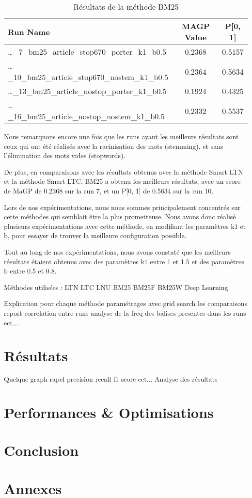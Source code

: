 \documentclass[a4paper, 12pt]{article}
\begin{document}
\begin{table}[h]
  \centering
  \begin{tabular}{l c c}
      \toprule
      \textbf{Run Name} & \textbf{MAGP Value} & \textbf{P[0, 1]} \\
      \midrule
      \dots\_7\_bm25\_article\_stop670\_porter\_k1\_b0.5 & 0.2368 & 0.5157 \\
      \dots\_10\_bm25\_article\_stop670\_nostem\_k1\_b0.5 & 0.2364 & 0.5634 \\
      \dots\_13\_bm25\_article\_nostop\_porter\_k1\_b0.5 & 0.1924 & 0.4325 \\
      \dots\_16\_bm25\_article\_nostop\_nostem\_k1\_b0.5 & 0.2332 & 0.5537 \\
      \bottomrule
  \end{tabular}
  \caption{Résultats de la méthode BM25}
  \label{tab:result_bm25}
\end{table}

Nous remarquons encore une fois que les runs ayant les meilleurs résultats sont ceux qui ont été réalisés 
avec la racinisation des mots (stemming), et sans l'élimination des mots vides (stopwords).

De plus, en comparaisons avec les résultats obtenus avec la méthode Smart LTN et la méthode Smart LTC, BM25 
a obtenu les meilleurs résultats, avec un score de MaGP de 0.2368 sur la run 7, et un P[0, 1] de 0.5634 sur la run 10.

Lors de nos expérimentations, nous nous sommes principalement concentrés sur cette méthodes qui 
semblait être la plus prometteuse. 
Nous avons donc réalisé plusieurs expérimentations avec cette méthode, 
en modifiant les paramètres $\text{k1}$ et $\text{b}$, pour essayer de trouver la meilleure configuration possible.

Tout au long de nos expérimentations, nous avons constaté que les meilleurs résultats 
étaient obtenus avec des paramètres $\text{k1}$ entre 1 et 1.5 et des paramètres $\text{b}$ entre 0.5 et 0.8.


 

Méthodes utilisées :
LTN 
LTC
LNU
BM25
BM25F
BM25W
Deep Learning

Explication pour chaque méthode 
paramétrages avec grid search les comparaisons report
correlation entre runs
analyse de la freq des balises presentes dans les runs
ect...


\section{Résultats}
Quelque graph rapel precision recall f1 score ect...
Analyse des résultats

\section{Performances \& Optimisations}

\section{Conclusion}

\section{Annexes}
\end{document}
